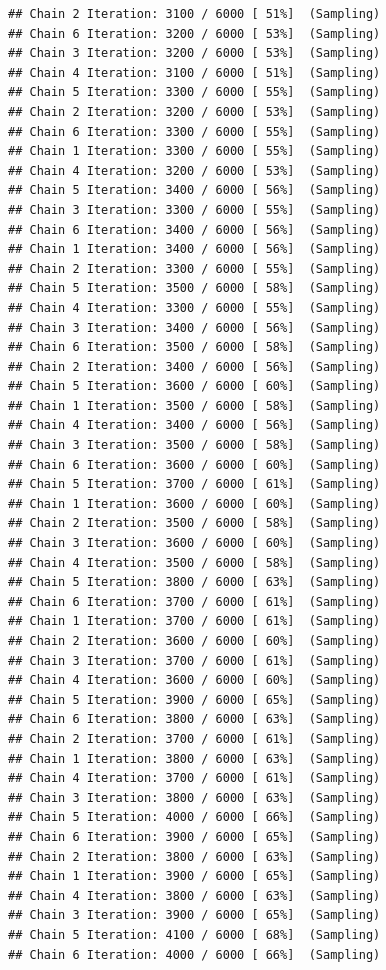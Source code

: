 \documentclass[
]{article}
\begin{document}
\begin{verbatim}
## Chain 2 Iteration: 3100 / 6000 [ 51%]  (Sampling) 
## Chain 6 Iteration: 3200 / 6000 [ 53%]  (Sampling) 
## Chain 3 Iteration: 3200 / 6000 [ 53%]  (Sampling) 
## Chain 4 Iteration: 3100 / 6000 [ 51%]  (Sampling) 
## Chain 5 Iteration: 3300 / 6000 [ 55%]  (Sampling) 
## Chain 2 Iteration: 3200 / 6000 [ 53%]  (Sampling) 
## Chain 6 Iteration: 3300 / 6000 [ 55%]  (Sampling) 
## Chain 1 Iteration: 3300 / 6000 [ 55%]  (Sampling) 
## Chain 4 Iteration: 3200 / 6000 [ 53%]  (Sampling) 
## Chain 5 Iteration: 3400 / 6000 [ 56%]  (Sampling) 
## Chain 3 Iteration: 3300 / 6000 [ 55%]  (Sampling) 
## Chain 6 Iteration: 3400 / 6000 [ 56%]  (Sampling) 
## Chain 1 Iteration: 3400 / 6000 [ 56%]  (Sampling) 
## Chain 2 Iteration: 3300 / 6000 [ 55%]  (Sampling) 
## Chain 5 Iteration: 3500 / 6000 [ 58%]  (Sampling) 
## Chain 4 Iteration: 3300 / 6000 [ 55%]  (Sampling) 
## Chain 3 Iteration: 3400 / 6000 [ 56%]  (Sampling) 
## Chain 6 Iteration: 3500 / 6000 [ 58%]  (Sampling) 
## Chain 2 Iteration: 3400 / 6000 [ 56%]  (Sampling) 
## Chain 5 Iteration: 3600 / 6000 [ 60%]  (Sampling) 
## Chain 1 Iteration: 3500 / 6000 [ 58%]  (Sampling) 
## Chain 4 Iteration: 3400 / 6000 [ 56%]  (Sampling) 
## Chain 3 Iteration: 3500 / 6000 [ 58%]  (Sampling) 
## Chain 6 Iteration: 3600 / 6000 [ 60%]  (Sampling) 
## Chain 5 Iteration: 3700 / 6000 [ 61%]  (Sampling) 
## Chain 1 Iteration: 3600 / 6000 [ 60%]  (Sampling) 
## Chain 2 Iteration: 3500 / 6000 [ 58%]  (Sampling) 
## Chain 3 Iteration: 3600 / 6000 [ 60%]  (Sampling) 
## Chain 4 Iteration: 3500 / 6000 [ 58%]  (Sampling) 
## Chain 5 Iteration: 3800 / 6000 [ 63%]  (Sampling) 
## Chain 6 Iteration: 3700 / 6000 [ 61%]  (Sampling) 
## Chain 1 Iteration: 3700 / 6000 [ 61%]  (Sampling) 
## Chain 2 Iteration: 3600 / 6000 [ 60%]  (Sampling) 
## Chain 3 Iteration: 3700 / 6000 [ 61%]  (Sampling) 
## Chain 4 Iteration: 3600 / 6000 [ 60%]  (Sampling) 
## Chain 5 Iteration: 3900 / 6000 [ 65%]  (Sampling) 
## Chain 6 Iteration: 3800 / 6000 [ 63%]  (Sampling) 
## Chain 2 Iteration: 3700 / 6000 [ 61%]  (Sampling) 
## Chain 1 Iteration: 3800 / 6000 [ 63%]  (Sampling) 
## Chain 4 Iteration: 3700 / 6000 [ 61%]  (Sampling) 
## Chain 3 Iteration: 3800 / 6000 [ 63%]  (Sampling) 
## Chain 5 Iteration: 4000 / 6000 [ 66%]  (Sampling) 
## Chain 6 Iteration: 3900 / 6000 [ 65%]  (Sampling) 
## Chain 2 Iteration: 3800 / 6000 [ 63%]  (Sampling) 
## Chain 1 Iteration: 3900 / 6000 [ 65%]  (Sampling) 
## Chain 4 Iteration: 3800 / 6000 [ 63%]  (Sampling) 
## Chain 3 Iteration: 3900 / 6000 [ 65%]  (Sampling) 
## Chain 5 Iteration: 4100 / 6000 [ 68%]  (Sampling) 
## Chain 6 Iteration: 4000 / 6000 [ 66%]  (Sampling) 

\end{verbatim}
\end{document}
